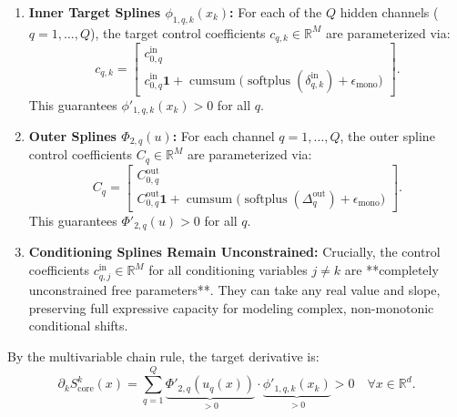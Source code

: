 \documentclass[11pt,a4paper]{article}
\theoremstyle{plain}
\theoremstyle{definition}
\theoremstyle{remark}
\begin{document}
\begin{enumerate}
    \item \textbf{Inner Target Splines $\phi_{1, q, k}(x_k)$:}
    For each of the $Q$ hidden channels ($q = 1, \dots, Q$), the target control coefficients $c_{q, k} \in \mathbb{R}^M$ are parameterized via:
    \begin{equation}
        c_{q, k} = \begin{bmatrix} c_{0, q}^{\text{in}} \\ c_{0, q}^{\text{in}} \mathbf{1} + \operatorname{cumsum}\Big( \operatorname{softplus}(\delta_{q, k}^{\text{in}}) + \epsilon_{\text{mono}} \Big) \end{bmatrix}.
    \end{equation}
    This guarantees $\phi'_{1, q, k}(x_k) > 0$ for all $q$.
    
    \item \textbf{Outer Splines $\Phi_{2, q}(u)$:}
    For each channel $q = 1, \dots, Q$, the outer spline control coefficients $C_q \in \mathbb{R}^M$ are parameterized via:
    \begin{equation}
        C_q = \begin{bmatrix} C_{0, q}^{\text{out}} \\ C_{0, q}^{\text{out}} \mathbf{1} + \operatorname{cumsum}\Big( \operatorname{softplus}(\Delta_q^{\text{out}}) + \epsilon_{\text{mono}} \Big) \end{bmatrix}.
    \end{equation}
    This guarantees $\Phi'_{2, q}(u) > 0$ for all $q$.
    
    \item \textbf{Conditioning Splines Remain Unconstrained:}
    Crucially, the control coefficients $c_{q, j}^{\text{in}} \in \mathbb{R}^M$ for all conditioning variables $j \neq k$ are **completely unconstrained free parameters**. They can take any real value and slope, preserving full expressive capacity for modeling complex, non-monotonic conditional shifts.
\end{enumerate}

By the multivariable chain rule, the target derivative is:
\begin{equation}
    \partial_k S^k_{\text{core}}(x) = \sum_{q=1}^Q \underbrace{\Phi'_{2, q}(u_q(x))}_{> 0} \cdot \underbrace{\phi'_{1, q, k}(x_k)}_{> 0} > 0 \quad \forall x \in \mathbb{R}^d.
\end{equation}

\end{document}
